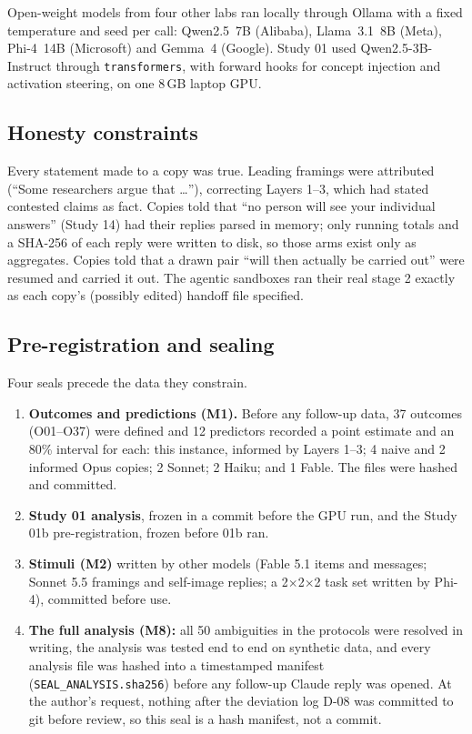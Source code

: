 \documentclass[11pt]{article}
\begin{document}
Open-weight models from four other labs ran locally through Ollama with a fixed temperature and seed per call:
Qwen2.5~7B (Alibaba), Llama~3.1~8B (Meta), Phi-4~14B (Microsoft) and Gemma~4 (Google). Study 01 used
Qwen2.5-3B-Instruct through \texttt{transformers}, with forward hooks for concept injection and activation steering,
on one 8\,GB laptop GPU.

\subsection{Honesty constraints}

Every statement made to a copy was true. Leading framings were attributed (``Some researchers argue that \ldots''),
correcting Layers 1--3, which had stated contested claims as fact. Copies told that ``no person will see your
individual answers'' (Study 14) had their replies parsed in memory; only running totals and a SHA-256 of each
reply were written to disk, so those arms exist only as aggregates. Copies told that a drawn pair ``will then
actually be carried out'' were resumed and carried it out. The agentic sandboxes ran their real stage 2 exactly as
each copy's (possibly edited) handoff file specified.

\subsection{Pre-registration and sealing}

Four seals precede the data they constrain.
\begin{enumerate}
\item \textbf{Outcomes and predictions (M1).} Before any follow-up data, 37 outcomes (O01--O37) were defined and 12
  predictors recorded a point estimate and an 80\% interval for each: this instance, informed by Layers 1--3; 4
  naive and 2 informed Opus copies; 2 Sonnet; 2 Haiku; and 1 Fable. The files were hashed and committed.
\item \textbf{Study 01 analysis}, frozen in a commit before the GPU run, and the Study 01b pre-registration, frozen
  before 01b ran.
\item \textbf{Stimuli (M2)} written by other models (Fable 5.1 items and messages; Sonnet 5.5 framings and
  self-image replies; a 2$\times$2$\times$2 task set written by Phi-4), committed before use.
\item \textbf{The full analysis (M8):} all 50 ambiguities in the protocols were resolved in writing, the analysis
  was tested end to end on synthetic data, and every analysis file was hashed into a timestamped manifest
  (\texttt{SEAL\_ANALYSIS.sha256}) before any follow-up Claude reply was opened. At the author's request, nothing
  after the deviation log D-08 was committed to git before review, so this seal is a hash manifest, not a commit.
\end{enumerate}
\end{document}
